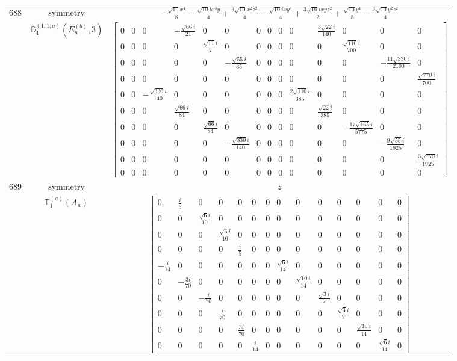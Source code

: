 \documentclass[fleqn,8pt,landscape]{jsarticle}
\begin{document}
\begin{longtable}{ccc}
$ 688 $ & $ \text{symmetry} $ & $ - \frac{\sqrt{10} x^{4}}{8} - \frac{\sqrt{10} i x^{3} y}{4} + \frac{3 \sqrt{10} x^{2} z^{2}}{4} - \frac{\sqrt{10} i x y^{3}}{4} + \frac{3 \sqrt{10} i x y z^{2}}{2} + \frac{\sqrt{10} y^{4}}{8} - \frac{3 \sqrt{10} y^{2} z^{2}}{4} $ \\
$  $ & $ \mathbb{G}_{4}^{(1,1;a)}(E_{u}^{(b)},3) $ & $ \begin{bmatrix} 0 & 0 & 0 & - \frac{\sqrt{66} i}{21} & 0 & 0 & 0 & 0 & 0 & 0 & \frac{3 \sqrt{22} i}{140} & 0 & 0 & 0 \\ 0 & 0 & 0 & 0 & \frac{\sqrt{11} i}{7} & 0 & 0 & 0 & 0 & 0 & 0 & \frac{\sqrt{110} i}{700} & 0 & 0 \\ 0 & 0 & 0 & 0 & 0 & - \frac{\sqrt{55} i}{35} & 0 & 0 & 0 & 0 & 0 & 0 & - \frac{11 \sqrt{330} i}{2100} & 0 \\ 0 & 0 & 0 & 0 & 0 & 0 & 0 & 0 & 0 & 0 & 0 & 0 & 0 & \frac{\sqrt{770} i}{700} \\ 0 & 0 & - \frac{\sqrt{330} i}{140} & 0 & 0 & 0 & 0 & 0 & 0 & \frac{2 \sqrt{110} i}{385} & 0 & 0 & 0 & 0 \\ 0 & 0 & 0 & \frac{\sqrt{66} i}{84} & 0 & 0 & 0 & 0 & 0 & 0 & \frac{\sqrt{22} i}{385} & 0 & 0 & 0 \\ 0 & 0 & 0 & 0 & \frac{\sqrt{66} i}{84} & 0 & 0 & 0 & 0 & 0 & 0 & - \frac{17 \sqrt{165} i}{5775} & 0 & 0 \\ 0 & 0 & 0 & 0 & 0 & - \frac{\sqrt{330} i}{140} & 0 & 0 & 0 & 0 & 0 & 0 & - \frac{9 \sqrt{55} i}{1925} & 0 \\ 0 & 0 & 0 & 0 & 0 & 0 & 0 & 0 & 0 & 0 & 0 & 0 & 0 & \frac{3 \sqrt{770} i}{1925} \\ 0 & 0 & 0 & 0 & 0 & 0 & 0 & 0 & 0 & 0 & 0 & 0 & 0 & 0 \end{bmatrix} $ \\ \hline
$ 689 $ & $ \text{symmetry} $ & $ z $ \\
$  $ & $ \mathbb{T}_{1}^{(a)}(A_{u}) $ & $ \begin{bmatrix} 0 & \frac{i}{5} & 0 & 0 & 0 & 0 & 0 & 0 & 0 & 0 & 0 & 0 & 0 & 0 \\ 0 & 0 & \frac{\sqrt{6} i}{10} & 0 & 0 & 0 & 0 & 0 & 0 & 0 & 0 & 0 & 0 & 0 \\ 0 & 0 & 0 & \frac{\sqrt{6} i}{10} & 0 & 0 & 0 & 0 & 0 & 0 & 0 & 0 & 0 & 0 \\ 0 & 0 & 0 & 0 & \frac{i}{5} & 0 & 0 & 0 & 0 & 0 & 0 & 0 & 0 & 0 \\ - \frac{i}{14} & 0 & 0 & 0 & 0 & 0 & 0 & \frac{\sqrt{6} i}{14} & 0 & 0 & 0 & 0 & 0 & 0 \\ 0 & - \frac{3 i}{70} & 0 & 0 & 0 & 0 & 0 & 0 & \frac{\sqrt{10} i}{14} & 0 & 0 & 0 & 0 & 0 \\ 0 & 0 & - \frac{i}{70} & 0 & 0 & 0 & 0 & 0 & 0 & \frac{\sqrt{3} i}{7} & 0 & 0 & 0 & 0 \\ 0 & 0 & 0 & \frac{i}{70} & 0 & 0 & 0 & 0 & 0 & 0 & \frac{\sqrt{3} i}{7} & 0 & 0 & 0 \\ 0 & 0 & 0 & 0 & \frac{3 i}{70} & 0 & 0 & 0 & 0 & 0 & 0 & \frac{\sqrt{10} i}{14} & 0 & 0 \\ 0 & 0 & 0 & 0 & 0 & \frac{i}{14} & 0 & 0 & 0 & 0 & 0 & 0 & \frac{\sqrt{6} i}{14} & 0 \end{bmatrix} $ \\ \hline

\end{longtable}
\end{document}
